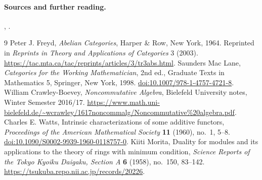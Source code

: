 \documentclass[11pt,a4paper]{article}
\theoremstyle{plain}
\theoremstyle{definition}
\begin{document}
\paragraph{Sources and further reading.}
\cite[\S\S1.11, 3.5 and 3.12]{crawley}, \cite[Ch. I]{morita}.
\clearpage
\begin{thebibliography}{9}
 Peter J. Freyd, \emph{Abelian Categories}, Harper \& Row, New York, 1964. Reprinted in \emph{Reprints in Theory and Applications of Categories} 3 (2003). \url{https://tac.mta.ca/tac/reprints/articles/3/tr3abs.html}.
 Saunders Mac Lane, \emph{Categories for the Working Mathematician}, 2nd ed., Graduate Texts in Mathematics 5, Springer, New York, 1998. \href{https://doi.org/10.1007/978-1-4757-4721-8}{doi:10.1007/978-1-4757-4721-8}.
 William Crawley-Boevey, \emph{Noncommutative Algebra}, Bielefeld University notes, Winter Semester 2016/17. \url{https://www.math.uni-bielefeld.de/~wcrawley/1617noncommalg/Noncommutative\%20algebra.pdf}.
 Charles E. Watts, Intrinsic characterizations of some additive functors, \emph{Proceedings of the American Mathematical Society} \textbf{11} (1960), no.~1, 5--8. \href{https://doi.org/10.1090/S0002-9939-1960-0118757-0}{doi:10.1090/S0002-9939-1960-0118757-0}.
 Kiiti Morita, Duality for modules and its applications to the theory of rings with minimum condition, \emph{Science Reports of the Tokyo Kyoiku Daigaku, Section A} \textbf{6} (1958), no.~150, 83--142. \url{https://tsukuba.repo.nii.ac.jp/records/20226}.
\end{thebibliography}
\end{document}
